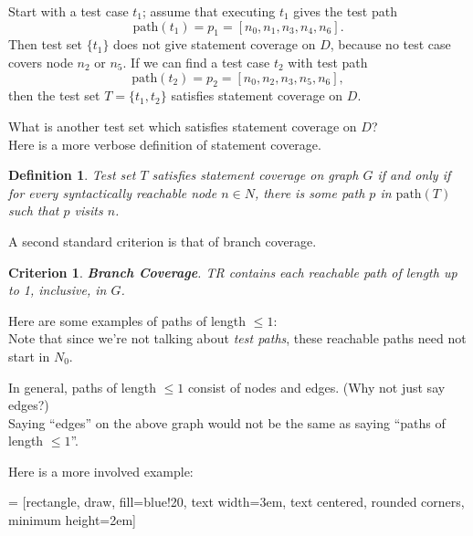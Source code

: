 \documentclass[11pt]{article}
\newtheorem{defn}{Definition}
\newtheorem{crit}{Criterion}
\begin{document}
Start with a test case $t_1$; assume that executing $t_1$ gives the
test path 
\[ \mbox{path}(t_1) = p_1 = [n_0, n_1, n_3, n_4, n_6].\] 
Then
test set $\{ t_1\}$ does not give statement coverage on $D$, because no
test case covers node $n_2$ or $n_5$. If we can find a test case $t_2$
with test path 
\[\mbox{path}(t_2) = p_2 = [n_0, n_2, n_3, n_5, n_6],\]
then the test set $T = \{ t_1, t_2 \}$ satisfies statement coverage on $D$.

{\sf What is another test set which satisfies statement coverage on $D$?}\\[2em]


Here is a more verbose definition of statement coverage.

\begin{defn}
Test set $T$ satisfies \emph{statement coverage} on graph $G$ if and only
if for every syntactically reachable node $n \in N$, there is some
path $p$ in $\mbox{path}(T)$ such that $p$ visits $n$.
\end{defn}

A second standard criterion is that of branch coverage.
\begin{crit}
{\bf Branch Coverage}. TR contains each reachable path of length up
to 1, inclusive, in $G$.
\end{crit}

{\sf Here are some examples of paths of length $\le 1$:}\\[1em]
Note that since we're not talking about \emph{test paths}, these
reachable paths need not start in $N_0$.

In general, paths of length $\le 1$ consist of nodes and edges. {\sf (Why not just
say edges?)}\\[3em]

Saying ``edges'' on the above graph would not be the same as saying ``paths
of length $\le 1$''.

\newpage
Here is a more involved example:

 = [rectangle, draw, fill=blue!20, 
    text width=3em, text centered, rounded corners, minimum height=2em]
\end{document}
